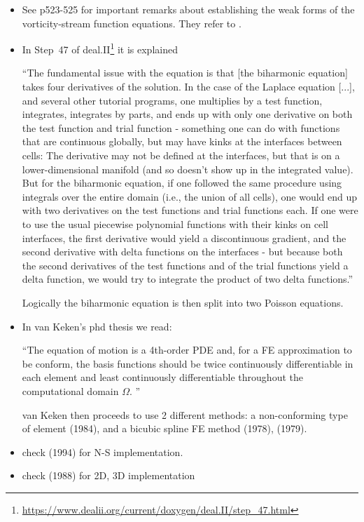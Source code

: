 \begin{itemize}
\item 
See \textcite{grsa} p523-525 for important remarks about establishing the weak forms of the vorticity-stream function equations. They refer to \cite{stev82}.

\item 
In Step~47 of deal.II\footnote{\url{https://www.dealii.org/current/doxygen/deal.II/step_47.html}} it is explained 
\begin{displayquote}
{\color{darkgray}
``The fundamental issue with the equation is that [the biharmonic equation] takes four 
derivatives of the solution. In the case of the Laplace equation [...], and several other 
tutorial programs, one multiplies by a test function, integrates, integrates by parts, 
and ends up with only one derivative on both the test function and trial function - 
something one can do with functions that are continuous globally, but may have kinks 
at the interfaces between cells: The derivative may not be defined at the interfaces, 
but that is on a lower-dimensional manifold (and so doesn't show up in the integrated value).\\
But for the biharmonic equation, if one followed the same procedure using integrals over 
the entire domain (i.e., the union of all cells), one would end up with two derivatives 
on the test functions and trial functions each. If one were to use the usual piecewise 
polynomial functions with their kinks on cell interfaces, the first derivative would 
yield a discontinuous gradient, and the second derivative with delta functions on the 
interfaces - but because both the second derivatives of the test functions and of the 
trial functions yield a delta function, we would try to integrate the product of two delta functions.''}
\end{displayquote}
Logically the biharmonic equation is then split into two Poisson equations.

\item In van Keken's phd thesis we read: 
\begin{displayquote}
{\color{darkgray}
``The equation of motion is a 4th-order PDE and, 
for a FE approximation to be conform, the basis functions should be twice 
continuously differentiable in each element and least continuously differentiable throughout
the computational domain $\Omega$. ''
}
\end{displayquote}
van Keken then proceeds to use 2 different methods: a non-conforming type of element
\textcite{haeb84} (1984), and a bicubic spline FE method \textcite{woid78} (1978), \textcite{kopi79} (1979).

\item check \textcite{comn94} (1994) for N-S implementation.
\item check \textcite{gupe88} (1988) for 2D, 3D implementation

\end{itemize}

